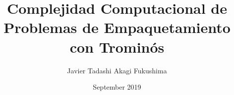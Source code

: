 \usepackage{cmap} %
\usepackage[T1]{fontenc} %
\usepackage{lmodern} %
\usepackage{amsfonts}
\usepackage{csquotes} %
\usepackage[
	spanish
]{babel} %
\usepackage[
	backend=biber,
	style=numeric,
	sorting=none,
	maxbibnames=99
]{biblatex} %
\usepackage{amsmath} %
\usepackage{amsthm} %
\usepackage{siunitx} %
\usepackage{graphicx} %
\usepackage{xcolor} %
\usepackage{import} %
\usepackage{changepage} %
\usepackage{multirow} %
\usepackage[
	Algoritmo
]{algorithm} %
\usepackage[
	noend
]{algpseudocode} %
\usepackage{caption} %
\usepackage[
	list=true
]{subcaption} %
\usepackage{booktabs} %
\usepackage{imakeidx} %
\usepackage{geometry} %
\usepackage{setspace} %
\usepackage{chngcntr} %
\usepackage{hyperref} %
\usepackage{amssymb} %
\usepackage{environ} %
\usepackage{mathrsfs} %
\usepackage{titlesec} %
\usepackage{enumitem} %
\usepackage{multicol} %
\usepackage{cleveref} %

\makeindex[title=ÍNDICE ALFABÉTICO, options= -s index.ist, intoc]



\title{Complejidad Computacional de Problemas de Empaquetamiento con Trominós}
\author{Javier Tadashi Akagi Fukushima}
\date{September 2019}

